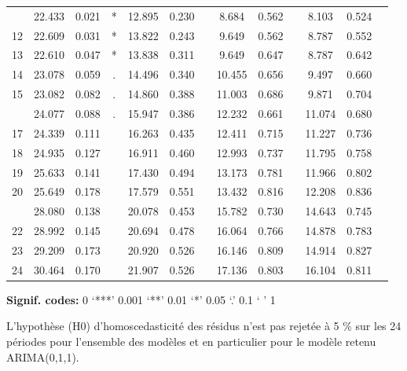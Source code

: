 \documentclass[,french]{article}
\begin{document}
\begin{table}[!h]
{\begin{threeparttable}
\begin{tabular}[t]{ccccccccccccc}
\addlinespace
11 & 22.433 & 0.021 & * & 12.895 & 0.230 &  & 8.684 & 0.562 &  & 8.103 & 0.524 & \\
12 & 22.609 & 0.031 & * & 13.822 & 0.243 &  & 9.649 & 0.562 &  & 8.787 & 0.552 & \\
13 & 22.610 & 0.047 & * & 13.838 & 0.311 &  & 9.649 & 0.647 &  & 8.787 & 0.642 & \\
14 & 23.078 & 0.059 & . & 14.496 & 0.340 &  & 10.455 & 0.656 &  & 9.497 & 0.660 & \\
15 & 23.082 & 0.082 & . & 14.860 & 0.388 &  & 11.003 & 0.686 &  & 9.871 & 0.704 & \\
\addlinespace
16 & 24.077 & 0.088 & . & 15.947 & 0.386 &  & 12.232 & 0.661 &  & 11.074 & 0.680 & \\
17 & 24.339 & 0.111 &  & 16.263 & 0.435 &  & 12.411 & 0.715 &  & 11.227 & 0.736 & \\
18 & 24.935 & 0.127 &  & 16.911 & 0.460 &  & 12.993 & 0.737 &  & 11.795 & 0.758 & \\
19 & 25.633 & 0.141 &  & 17.430 & 0.494 &  & 13.173 & 0.781 &  & 11.966 & 0.802 & \\
20 & 25.649 & 0.178 &  & 17.579 & 0.551 &  & 13.432 & 0.816 &  & 12.208 & 0.836 & \\
\addlinespace
21 & 28.080 & 0.138 &  & 20.078 & 0.453 &  & 15.782 & 0.730 &  & 14.643 & 0.745 & \\
22 & 28.992 & 0.145 &  & 20.694 & 0.478 &  & 16.064 & 0.766 &  & 14.878 & 0.783 & \\
23 & 29.209 & 0.173 &  & 20.920 & 0.526 &  & 16.146 & 0.809 &  & 14.914 & 0.827 & \\
24 & 30.464 & 0.170 &  & 21.907 & 0.526 &  & 17.136 & 0.803 &  & 16.104 & 0.811 & \\
\bottomrule
\end{tabular}
\begin{tablenotes}
\item \hspace{-0.4cm}\textbf{Signif. codes: }0 `***' 0.001 `**' 0.01 `*' 0.05 `.' 0.1 ` ' 1
\item L’hypothèse (H0) d’homoscedasticité des résidus n’est pas rejetée à 5 \% sur les 24 périodes pour l’ensemble des modèles et en particulier pour le modèle retenu ARIMA(0,1,1).
\end{tablenotes}
\end{threeparttable}}
\end{table}
\end{document}
